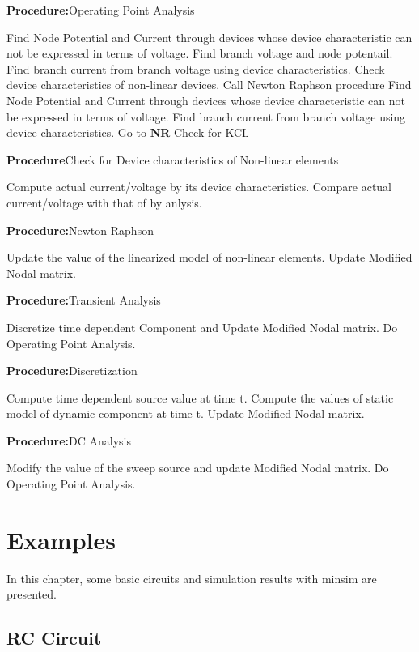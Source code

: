 \documentclass[a4paper,10pt]{report}
\begin{document}
{\bf Procedure:}{Operating Point Analysis}
\small
\begin{algorithmic}[1]
\STATE Find Node Potential and Current through devices whose device characteristic can not be expressed in terms of voltage.
\STATE Find branch voltage and node potentail.
\STATE Find branch current from branch voltage using device characteristics.
 Check  device characteristics of non-linear devices.
\STATE Call Newton Raphson procedure
\STATE Find Node Potential and Current through devices whose device characteristic can not be expressed in terms of voltage.
\STATE Find branch current from branch voltage using device characteristics.
\STATE Go to {\bf NR}
\ENDIF
\STATE Check for KCL
\ENDIF 
\end{algorithmic}
\normalsize

{\bf Procedure}{Check for Device characteristics of Non-linear elements}
\small
\begin{algorithmic}[1]
\STATE Compute actual current/voltage by its device characteristics.
\STATE Compare actual current/voltage with that of by anlysis.
\ENDFOR
\end{algorithmic}
\normalsize

{\bf Procedure:}{Newton Raphson}
\small
\begin{algorithmic}[1]
\STATE Update the value of the linearized model of non-linear elements.
\STATE Update Modified Nodal matrix.
\end{algorithmic}
\normalsize

{\bf Procedure:}{Transient Analysis}
\small
\begin{algorithmic}[1]
\STATE Discretize time dependent Component and Update Modified Nodal matrix.
\STATE Do Operating Point Analysis.
\end{algorithmic}
\normalsize

{\bf Procedure:}{Discretization}
\small
\begin{algorithmic}[1]
\STATE Compute time dependent source value at time t.
\STATE Compute the values of static model of dynamic component at time t.
\STATE Update Modified Nodal matrix. 
\end{algorithmic}
\normalsize

{\bf Procedure:}{DC Analysis}
\small
\begin{algorithmic}[1]
\STATE Modify the value of the sweep source and update Modified Nodal matrix.
\STATE Do Operating Point Analysis.
\end{algorithmic}
\normalsize

\chapter*{Examples}
In this chapter, some basic circuits and simulation results with minsim are presented. 
\section*{RC Circuit}
 
\end{document}
